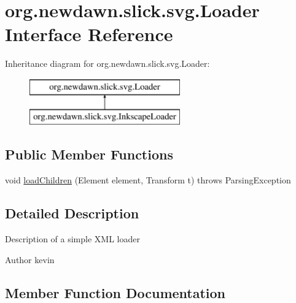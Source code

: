 \hypertarget{interfaceorg_1_1newdawn_1_1slick_1_1svg_1_1_loader}{}\section{org.\+newdawn.\+slick.\+svg.\+Loader Interface Reference}
\label{interfaceorg_1_1newdawn_1_1slick_1_1svg_1_1_loader}
Inheritance diagram for org.\+newdawn.\+slick.\+svg.\+Loader\+:\begin{figure}[H]
\begin{center}
\leavevmode
\includegraphics[height=2.000000cm]{interfaceorg_1_1newdawn_1_1slick_1_1svg_1_1_loader}
\end{center}
\end{figure}
\subsection*{Public Member Functions}
\begin{DoxyCompactItemize}
\item 
void \mbox{\hyperlink{interfaceorg_1_1newdawn_1_1slick_1_1svg_1_1_loader_a8a49534ac01fc17297cc38db9c9d4cbb}{load\+Children}} (Element element, Transform t)  throws Parsing\+Exception
\end{DoxyCompactItemize}


\subsection{Detailed Description}
Description of a simple X\+ML loader

\begin{DoxyAuthor}{Author}
kevin 
\end{DoxyAuthor}


\subsection{Member Function Documentation}
\mbox{\label{interfaceorg_1_1newdawn_1_1slick_1_1svg_1_1_loader_a8a49534ac01fc17297cc38db9c9d4cbb}} 
